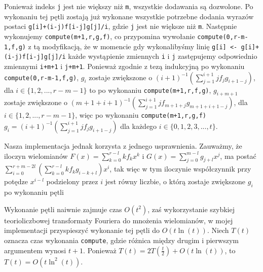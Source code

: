 \documentclass{article}
\begin{document}
Ponieważ indeks \texttt{j} jest nie większy niż \texttt{m}, wszystkie dodawania są dozwolone. 
Po wykonaniu tej pętli zostają już wykonane wszystkie
potrzebne dodania wyrazów postaci \texttt{g[i]+(i-j)f[i-j]g[j]/i}, gdzie \texttt{j} jest nie większe niż \texttt{m}. 
Następnie wykonujemy \texttt{compute(m+1,r,g,f)}, co przypomina wywołanie \texttt{compute(0,r-m-1,f,g)} z tą modyfikacją, że w momencie 
gdy wykonalibyśmy linię \texttt{g[i] <- g[i]+(i-j)f[i-j]g[j]/i} każde wystąpienie
zmiennych \texttt{i} i \texttt{j} zastępujemy odpowiednio zmiennymi \texttt{i+m+1} i \texttt{j+m+1}. Ponieważ zgodnie z tezą
indukcyjną po wykonaniu \texttt{compute(0,r-m-1,f,g)},
$g_i$ zostaje zwiększone o $(i+1)^{-1}(\sum_{j=1}^{i+1}jf_jg_{i+1-j})$, dla $i \in \{1,2,...,r-m-1\}$ 
to po wykonaniu \texttt{compute(m+1,r,f,g)}, $g_{i+m+1}$  zostaje zwiększone o $(m+1+i+1)^{-1}(\sum_{j=1}^{i+1}jf_{m+1+j}g_{m+1+i+1-j})$, 
dla $i \in \{1,2,...,r-m-1\}$, więc po wykonaniu \texttt{compute(m+1,r,g,f)} $g_i=(i+1)^{-1}(\sum_{j=1}^{i+1}jf_jg_{i+1-j})$ dla każdego
$i \in \{0,1,2,3,...,t\}$. 

Nasza implementacja jednak korzysta z jednego usprawnienia. Zauważmy, że iloczyn wielomianów $F(x)=\sum_{k=0}^{r-l}kf_kx^k$ i 
$G(x)=\sum_{j=0}^{m-l}g_{j+l}x^j$, ma postać 
$\sum_{i=0}^{r+m-2l}(\sum_{k=0}^{r-l}kf_kg_{i-k+l})x^i$, tak więc w tym iloczynie współczynnik przy potędze $x^{i-l}$ podzielony
przez $i$ jest równy liczbie, o którą zostaje zwiększone $g_i$ po wykonaniu pętli

\begin{algorithm}[H]
\end{algorithm}

Wykonanie pętli naiwnie zajmuje czas $O(t^2)$, zaś wykorzystanie szybkiej teorioliczbowej transformaty Fouriera do mnożenia wielomianów,
w mojej implementacji przyspieszyć wykonanie tej pętli do $O(t\ln(t))$.
Niech $T(t)$ oznacza czas wykonania \texttt{compute}, gdzie różnica między drugim i pierwszym argumentem wynosi $t+1$.
Ponieważ $T(t)=2T(\frac{t}{2})+O(t\ln(t))$, to $T(t)=O(t \ln^2(t))$.
\end{document}
